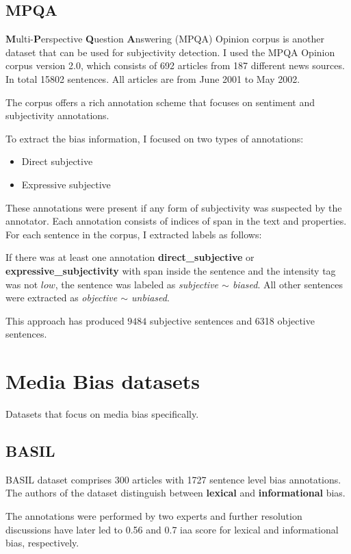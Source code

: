 \subsection{MPQA}
\textbf{M}ulti-\textbf{P}erspective \textbf{Q}uestion \textbf{A}nswering (MPQA) Opinion corpus is another dataset that can be used for subjectivity detection. I used the MPQA Opinion corpus version 2.0, which consists of 692 articles from 187 different news sources. In total 15802 sentences. All articles are from June 2001 to May 2002.

The corpus offers a rich annotation scheme \cite{wiebe2005annotating} that focuses on sentiment and subjectivity annotations.

To extract the bias information, I focused on two types of annotations:
\begin{itemize}
    \item Direct subjective
    \item Expressive subjective
\end{itemize}
These annotations were present if any form of subjectivity was suspected by the annotator. Each annotation consists of indices of span in the text and properties. For each sentence in the corpus, I extracted labels as follows:

If there was at least one annotation \textbf{direct\_subjective} or \textbf{expressive\_subjectivity} with span inside the sentence and the intensity tag was not $low$, the sentence was labeled as \textit{subjective $\sim$ biased}. All other sentences were extracted as \textit{objective $\sim$ unbiased}.

This approach has produced $9484$ subjective sentences and 6318 objective sentences.


\section{Media Bias datasets}
Datasets that focus on media bias specifically.

\subsection{BASIL}
BASIL dataset \cite{fan2019plain} comprises 300 articles with 1727 sentence level bias annotations. The authors of the dataset distinguish between \textbf{lexical} and \textbf{informational} bias.

The annotations were performed by two experts and further resolution discussions have later led to 0.56 and 0.7 \Gls{iaa} score for lexical and informational bias, respectively.

